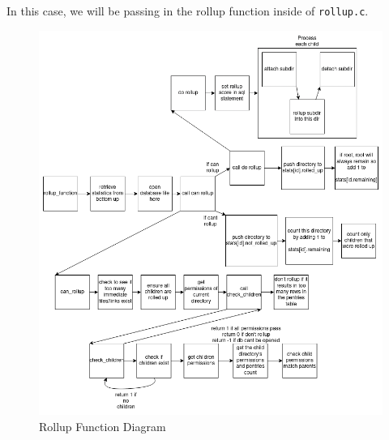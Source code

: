 In this case, we will be passing in the rollup function inside of \texttt{rollup.c}.

\begin{figure} [h]
\centering
\includegraphics[height=0.45\textheight]{images/rollup_function.png}
\caption{\label{fig:rollup_function} Rollup Function Diagram}
\end{figure}

\clearpage